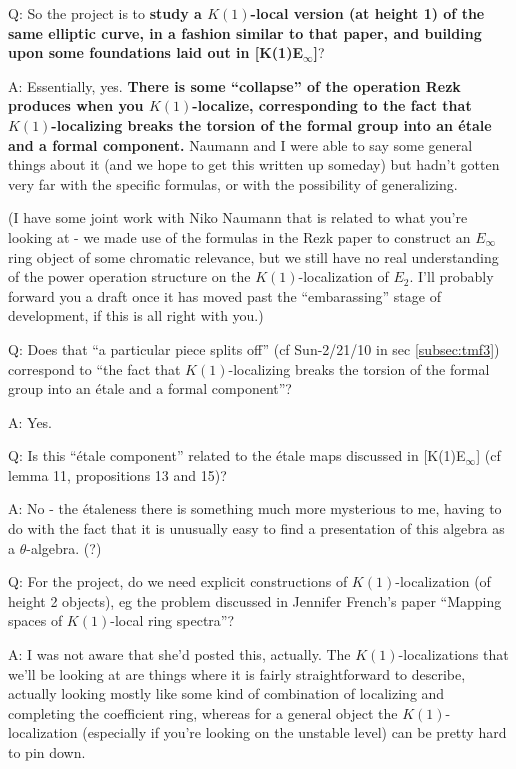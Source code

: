 \documentclass{rs}
\theoremstyle{definition}
\theoremstyle{remark}
\renewcommand{\=}{\approx}
\renewcommand{\-}{\sim}
\numberwithin{equation}{section}
\numberwithin{thm}{section}
\begin{document}
Q: So the project is to \textbf{study a $K(1)$-local version (at height 1) of the same elliptic curve, 
in a fashion similar to that paper, and building upon some foundations laid out in [K(1)E$_\infty$]}?

A: Essentially, yes. \textbf{There is some ``collapse'' of the operation Rezk produces when you $K(1)$-localize, 
corresponding to the fact that $K(1)$-localizing breaks the torsion of the formal group into 
an \'etale and a formal component.} Naumann and I were able to say some general things about it 
(and we hope to get this written up someday) but hadn't gotten very far with the specific formulas, 
or with the possibility of generalizing.

(I have some joint work with Niko Naumann that is related to what you're looking at - 
we made use of the formulas in the Rezk paper to construct an $E_\infty$ ring object of some chromatic relevance, 
but we still have no real understanding of the power operation structure on the $K(1)$-localization of $E_2$. 
I'll probably forward you a draft once it has moved past the ``embarassing'' stage of development, if this is all right with you.)

Q: Does that ``a particular piece splits off'' (cf Sun-2/21/10 in sec \ref{subsec:tmf3}) correspond to 
``the fact that $K(1)$-localizing breaks the torsion of the formal group into an \'etale and a formal component''? 

A: Yes.

Q: Is this ``\'etale component'' related to the \'etale maps discussed in [K(1)E$_\infty$] 
(cf lemma 11, propositions 13 and 15)?

A: No - the \'etaleness there is something much more mysterious to me,
having to do with the fact that it is unusually easy to find a
presentation of this algebra as a $\theta$-algebra. (?)

Q: For the project, do we need explicit constructions of $K(1)$-localization (of height 2 objects), 
eg the problem discussed in Jennifer French's paper ``Mapping spaces of $K(1)$-local ring spectra''?

A: I was not aware that she'd posted this, actually. 
The $K(1)$-localizations that we'll be looking at are things where it is fairly straightforward to describe, 
actually looking mostly like some kind of combination of localizing and completing the coefficient ring, 
whereas for a general object the $K(1)$-localization (especially if you're looking on the unstable level) 
can be pretty hard to pin down.
\end{document}
